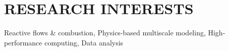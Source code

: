 \section{RESEARCH INTERESTS}
    \begin{itemize}[leftmargin=0.15in, label={}]
	{\item{
		Reactive flows \& combustion, Physics-based multiscale modeling, High-performance computing, Data analysis
	   }
     }
    \end{itemize}